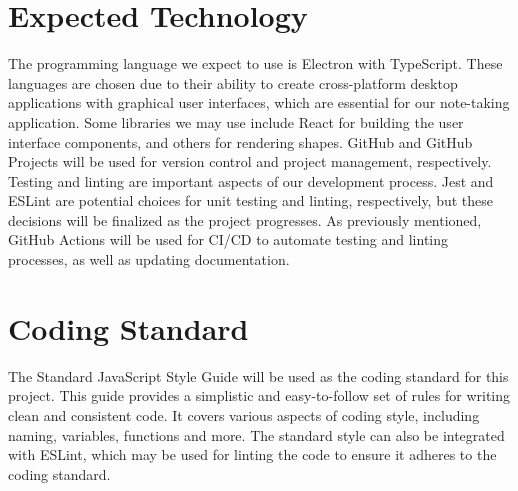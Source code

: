 \documentclass{article}
\begin{document}
\section{Expected Technology}



The programming language we expect to use is Electron with TypeScript. 
These languages are chosen due to their ability to create cross-platform 
desktop applications with graphical user interfaces, which are essential 
for our note-taking application. Some libraries we may use include React 
for building the user interface components, and others for rendering shapes.
 GitHub and GitHub Projects will be used for version control and 
project management, respectively. Testing and linting are important aspects
 of our development process. Jest and ESLint are potential choices 
for unit testing and linting, respectively, but these decisions will be 
finalized as the project progresses. As previously mentioned, GitHub 
Actions will be used for CI/CD to automate testing and linting processes,
 as well as updating documentation.

\section{Coding Standard}

The Standard JavaScript Style Guide will be used as the coding standard for
 this project. This guide provides a simplistic and easy-to-follow
set of rules for writing clean and consistent code. It covers various aspects
 of coding style, including naming, variables, functions and more.
The standard style can also be integrated with ESLint, which may be used for
 linting the code to ensure it adheres to the coding standard.
\end{document}
